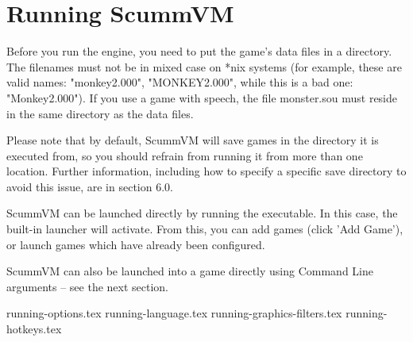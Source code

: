 


\section{Running ScummVM}

Before you run the engine, you need to put the game's data files in a
directory. The filenames must not be in mixed case on *nix systems
(for example, these are valid names: "monkey2.000", "MONKEY2.000", while
this is a bad one: "Monkey2.000"). If you use a game with speech, the file
monster.sou must reside in the same directory as the data files.

Please note that by default, ScummVM will save games in the directory
it is executed from, so you should refrain from running it from more than
one location. Further information, including how to specify a specific save
directory to avoid this issue, are in section 6.0.

ScummVM can be launched directly by running the executable. In this case,
the built-in launcher will activate. From this, you can add games (click
'Add Game'), or launch games which have already been configured.

ScummVM can also be launched into a game directly using Command Line
arguments -- see the next section.


 {running-options.tex}
 {running-language.tex}
 {running-graphics-filters.tex}
 {running-hotkeys.tex}
